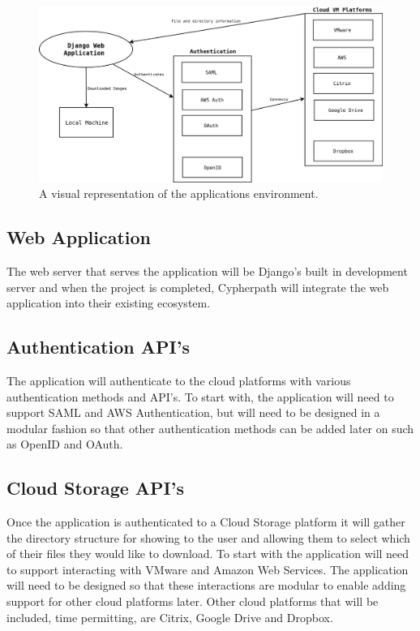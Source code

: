 \documentclass{article}
\begin{document}
    \begin{figure}[h]
    \includegraphics[scale=.4]{downloader_env}
        \caption{A visual representation of the applications environment.}
    \end{figure}


        \subsection{Web Application}
        The web server that serves the application will be Django's built in development server and when the project is completed, Cypherpath will integrate
        the web application into their existing ecosystem.

        
        \subsection{Authentication API's}
        The application will authenticate to the cloud platforms with various authentication methods and API's. To start with, the application will need to support
        SAML and AWS Authentication, but will need to be designed in a modular fashion so that other authentication methods can be added later on such as OpenID and OAuth.


        \subsection{Cloud Storage API's}
        Once the application is authenticated to a Cloud Storage platform it will gather the directory structure for showing to the user and allowing them to select
        which of their files they would like to download. To start with the application will need to support interacting with VMware and Amazon Web Services. The application will
        need to be designed so that these interactions are modular to enable adding support for other cloud platforms later. Other cloud platforms that will be included, time permitting,
        are Citrix, Google Drive and Dropbox.
\end{document}
